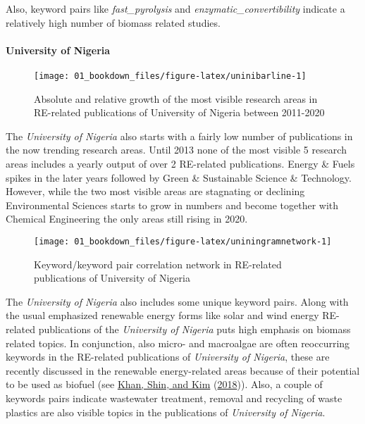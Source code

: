 \documentclass[12pt,twoside]{report}
\let\oldparagraph\paragraph
\renewcommand{\paragraph}[1]{\oldparagraph{#1}\mbox{}}
\begin{document}
Also, keyword pairs like \emph{fast\_pyrolysis} and \emph{enzymatic\_convertibility} indicate a relatively high number of biomass related studies.

\hypertarget{university-of-nigeria}{%
\paragraph{University of Nigeria}\label{university-of-nigeria}}

\begin{figure}
\texttt{[image: 01\_bookdown\_files/figure-latex/uninibarline-1]} \caption{Absolute and relative growth of the most visible research areas in RE-related publications of University of Nigeria between 2011-2020}\label{fig:uninibarline}
\end{figure}

The \emph{University of Nigeria} also starts with a fairly low number of publications in the now trending research areas. Until 2013 none of the most visible 5 research areas includes a yearly output of over 2 RE-related publications. Energy \& Fuels spikes in the later years followed by Green \& Sustainable Science \& Technology. However, while the two most visible areas are stagnating or declining Environmental Sciences starts to grow in numbers and become together with Chemical Engineering the only areas still rising in 2020.

\begin{figure}
\texttt{[image: 01\_bookdown\_files/figure-latex/uniningramnetwork-1]} \caption{Keyword/keyword pair correlation network in RE-related publications of University of Nigeria}\label{fig:uniningramnetwork}
\end{figure}

The \emph{University of Nigeria} also includes some unique keyword pairs. Along with the usual emphasized renewable energy forms like solar and wind energy RE-related publications of the \emph{University of Nigeria} puts high emphasis on biomass related topics. In conjunction, also micro- and macroalgae are often reoccurring keywords in the RE-related publications of \emph{University of Nigeria}, these are recently discussed in the renewable energy-related areas because of their potential to be used as biofuel (see \protect\hyperlink{ref-khan2018}{Khan, Shin, and Kim} (\protect\hyperlink{ref-khan2018}{2018})). Also, a couple of keywords pairs indicate wastewater treatment, removal and recycling of waste plastics are also visible topics in the publications of \emph{University of Nigeria}.
\end{document}
